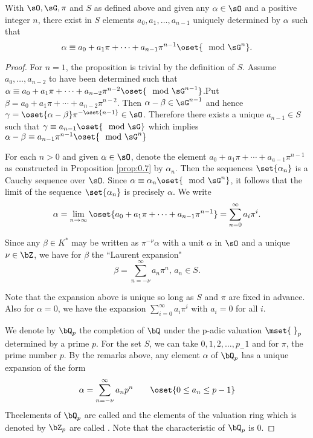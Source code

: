 \setcounter{prop}{6}
\begin{prop}\label{prop:0.7}
With $\sO,\sG,\pi$ and $S$ as defined above and given any 
$\alpha\in\sO$ and a positive integer $n$, there exist in $S$ elements 
$a_0,a_1,\ldots,a_{n-1}$ uniquely determined by $\alpha$ such that
$$
\alpha\equiv a_0+a_1\pi +\cdots +a_{n-1}\pi^{n-1}\oset{\mod\sG^n}.
$$
\end{prop}

\begin{proof}
For $n=1$, the proposition is trivial by the definition of $S$. Assume 
$a_0,\ldots,a_{n-2}$ to have been determined such that $\alpha\equiv 
a_0+a_1\pi +\cdots 
+a_{n-2}\pi^{n-2}\oset{\mod\sG^{n-1}}$.\pageoriginale Put $\beta 
=a_0+a_1\pi +\cdots +a_{n-2}\pi^{n-2}$. Then $\alpha 
-\beta\in\sG^{n-1}$ and hence $\gamma =\oset{\alpha 
-\beta}\pi^{-\oset{n-1}}\in\sO$. Therefore there exists a unique 
$a_{n-1}\in S$ such that $\gamma\equiv a_{n-1}\oset{\mod\sG}$ which 
implies $\alpha -\beta\equiv a_{n-1}\pi^{n-1}\oset{\mod\sG^n}$

For each $n>0$ and given $\alpha\in\sO$, denote the element 
$a_0+a_1\pi +\cdots +a_{a-1}\pi^{n-1}$ as constructed in Proposition 
\ref{prop:0.7} by $\alpha_n$. Then the sequences $\set{\alpha_n}$ is a 
Cauchy sequence over $\sO$. Since 
$\alpha\equiv\alpha_n\oset{\mod\sG^n}$, it follows that the limit of 
the sequence $\set{\alpha_n}$ is precisely $\alpha$. We write
$$
\alpha =\lim\limits_{n\to\infty}\oset{a_0+a_1\pi +\cdots 
+a_{n-1}\pi^{n-1}}=\sum\limits_{n=0}^{\infty}a_i\pi^i.
$$

Since any $\beta\in K^*$ may be written as $\pi^{-\nu}\alpha$ with a 
unit $\alpha$ in $\sO$ and a unique $\nu\in\bZ$, we have for $\beta$ 
the ``Laurent expansion"
$$
\beta = \sum\limits_{n= -\nu}^{\infty}a_n\pi^n, \,a_n\in S.
$$

Note that the expansion above is unique so long as $S$ and $\pi$ are 
fixed in advance. Also for $\alpha =0$, we have the expansion 
$\sum\limits_{i=0}^{\infty} a_i\pi^i$ with $a_i=0$ for all $i$.

We denote by $\bQ_p$ the completion of $\bQ$ under the p-adic 
valuation $\mset{\;}_p$ determined by a prime $p$. For the set $S$, we 
can take $0,1,2,\ldots,p_-1$ and for $\pi$, the prime number $p$. By 
the remarks above, any element $\alpha$ of $\bQ_p$ has a unique 
expansion of the form 
$$
\alpha =\sum\limits_{n= -\nu}^{\infty}a_np^n \qquad \oset{0\leq 
a_n\leq p-1}
$$
The\pageoriginale elements of $\bQ_p$ are called  
and the elements of the valuation ring which is denoted by $\bZ_p$ are 
called . Note that the characteristic of $\bQ_p$ 
is $0$.


\end{proof}
